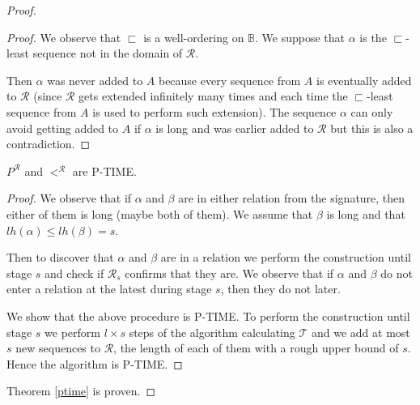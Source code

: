 \documentclass[a4paper,UKenglish,cleveref, autoref, thm-restate]{lipics-v2021}
\begin{document}
\begin{proof}
    \begin{proof}
        We observe that $\sqsubset$ is a well-ordering on $\mathbb{B}$. We suppose that $\alpha$ is the $\sqsubset$-least sequence not in the domain of $\mathcal{R}$.

        Then $\alpha$ was never added to $A$ because every sequence from $A$ is eventually added to $\mathcal{R}$ (since $\mathcal{R}$ gets extended infinitely many times and each time the $\sqsubset$-least sequence from $A$ is used to perform such extension). 
        The sequence $\alpha$ can only avoid getting added to $A$ if $\alpha$ is long and was earlier added to $\mathcal{R}$ but this is also a contradiction.
    \end{proof}

    \begin{lemma}
        $P^{\mathcal{R}}$ and $<^{\mathcal{R}}$ are P-TIME.
    \end{lemma}

    \begin{proof}
        We observe that if $\alpha$ and $\beta$ are in either relation from the signature, then either of them is long (maybe both of them). We assume that $\beta$ is long and that $lh(\alpha) \leq lh(\beta)=s$.

        Then to discover that $\alpha$ and $\beta$ are in a relation we perform the construction until stage $s$ and check if $\mathcal{R}_s$ confirms that they are. We observe that if $\alpha$ and $\beta$ do not enter a relation at the latest during stage $s$, then they do not later.

        We show that the above procedure is P-TIME. To perform the construction until stage $s$ we perform $l \times s$ steps of the algorithm calculating $\mathcal{T}$ and we add at most $s$ new sequences to $\mathcal{R}$, the length of each of them with a rough upper bound of $s$. Hence the algorithm is P-TIME.
    \end{proof}
Theorem \ref{ptime} is proven.\end{proof}
\end{document}
